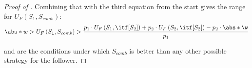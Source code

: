\begin{proof}[Proof of ]
Combining that with the third equation from the start gives the range for $U_F\left(S_1,S_{comb}\right)$:
\begin{equation} \label{equations: first condition for two strategies}
    \abs*{w} > U_F\left(S_1,S_{comb}\right) > \frac{p_1 \cdot U_F\left(S_1,\itf[S_2]\right) + p_2 \cdot U_F\left(S_2,\itf[S_2]\right) - p_2\cdot \abs*{\w}}{p_1}
\end{equation}

 and  are the conditions under which $S_{comb}$ is better than any other possible strategy for the follower.
\end{proof}